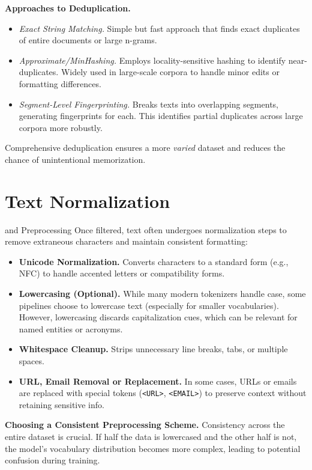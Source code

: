 \noindent
\textbf{Approaches to Deduplication.}
\begin{itemize}
    \item \emph{Exact String Matching.} Simple but fast approach that finds exact duplicates of entire documents or large n-grams.
    \item \emph{Approximate/MinHashing.} Employs locality-sensitive hashing to identify near-duplicates. Widely used in large-scale corpora to handle minor edits or formatting differences.
    \item \emph{Segment-Level Fingerprinting.} Breaks texts into overlapping segments, generating fingerprints for each. This identifies partial duplicates across large corpora more robustly.
\end{itemize}
Comprehensive deduplication ensures a more \emph{varied} dataset and reduces the chance of unintentional memorization.

\section{Text Normalization} and Preprocessing
\noindent
Once filtered, text often undergoes normalization steps to remove extraneous characters and maintain consistent formatting:
\begin{itemize}
    \item \textbf{Unicode Normalization.} Converts characters to a standard form (e.g., NFC) to handle accented letters or compatibility forms.
    \item \textbf{Lowercasing (Optional).} While many modern tokenizers handle case, some pipelines choose to lowercase text (especially for smaller vocabularies). However, lowercasing discards capitalization cues, which can be relevant for named entities or acronyms.
    \item \textbf{Whitespace Cleanup.} Strips unnecessary line breaks, tabs, or multiple spaces.
    \item \textbf{URL, Email Removal or Replacement.} In some cases, URLs or emails are replaced with special tokens (\texttt{<URL>}, \texttt{<EMAIL>}) to preserve context without retaining sensitive info.
\end{itemize}

\noindent
\textbf{Choosing a Consistent Preprocessing Scheme.}  
Consistency across the entire dataset is crucial. If half the data is lowercased and the other half is not, the model's vocabulary distribution becomes more complex, leading to potential confusion during training.

